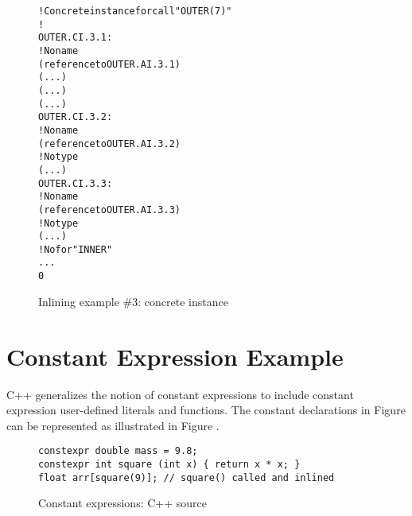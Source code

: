 \begin{figure}[t]
\begin{dwflisting}
\begin{alltt}
    ! Concrete instance for call "OUTER(7)"
    ! 
OUTER.CI.3.1:
        ! No name
        (reference to OUTER.AI.3.1)
        (...)
        (...)
        (...)
OUTER.CI.3.2:
            ! No name
            (reference to OUTER.AI.3.2)
            ! No type
            (...)
OUTER.CI.3.3:
            ! No name
            (reference to OUTER.AI.3.3)
            ! No type
            (...)
        ! No  for "INNER"
        ...
        0
\end{alltt}
\end{dwflisting}
\caption{Inlining example \#3: concrete instance}
\label{fig:inliningexample3concreteinstance}
\end{figure}

\clearpage
\section{Constant Expression Example}
\label{app:constantexpressionexample}
C++ generalizes the notion of constant expressions to include
constant expression user-defined literals and functions.
The constant declarations in Figure 
can be represented as illustrated in 
Figure .


\begin{figure}[here]
\begin{lstlisting}[numbers=none]
constexpr double mass = 9.8;
constexpr int square (int x) { return x * x; }
float arr[square(9)]; // square() called and inlined
\end{lstlisting}
\caption{Constant expressions: C++ source} \label{fig:constantexpressionscsource}
\end{figure}


